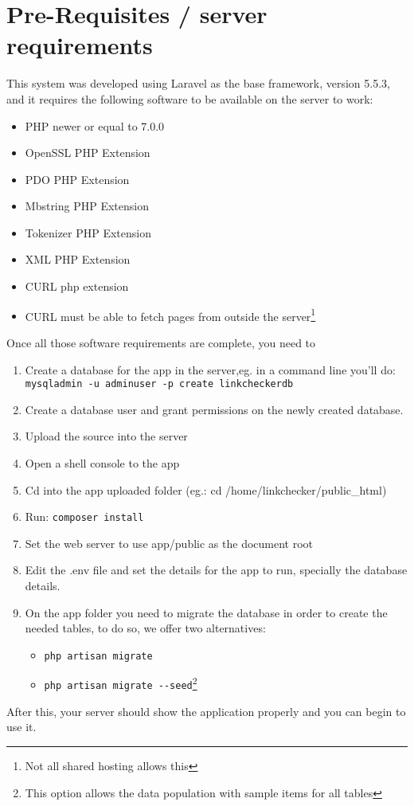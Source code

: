 \section{Pre-Requisites / server requirements}
This system was developed using Laravel as the base framework, version 5.5.3, and it requires the following software to be available on the server to work:

\begin{itemize}
	\item PHP newer or equal to 7.0.0
	\item OpenSSL PHP Extension
	\item PDO PHP Extension
	\item Mbstring PHP Extension
	\item Tokenizer PHP Extension
	\item XML PHP Extension
	\item CURL php extension
	\item CURL must be able to fetch pages from outside the server\footnote{Not all shared hosting allows this}
\end{itemize}

Once all those software requirements are complete, you need to 

\begin{enumerate}
	\item Create a database for the app in the server,eg. in a command line you'll do: \verb|mysqladmin -u adminuser -p create linkcheckerdb|
	\item Create a database user and grant permissions on the newly created database.
	\item Upload the source into the server
	\item Open a shell console to the app
	\item Cd into the app uploaded folder (eg.: cd /home/linkchecker/public\_html)
	\item Run: \verb|composer install|
	\item Set the web server to use app/public as the document root 
	\item Edit the .env file and set the details for the app to run, specially the database details.
	\item On the app folder you need to migrate the database in order to create the needed tables, to do so, we offer two alternatives:
	\begin{itemize}
		\item \verb|php artisan migrate| 
		\item \verb|php artisan migrate --seed|\footnote{This option allows the data population with sample items for all tables}
	\end{itemize}
\end{enumerate}
After this, your server should show the application properly and you can begin to use it.

